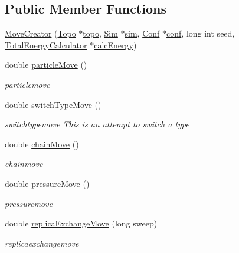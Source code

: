 \subsection*{Public Member Functions}
\begin{DoxyCompactItemize}
\item 
\hyperlink{class_move_creator_aa35bf0832806de7d919a7eed7fb963a5}{Move\+Creator} (\hyperlink{class_topo}{Topo} $\ast$\hyperlink{class_move_creator_a34a03c3300543b9db3f7b03bb77027d3}{topo}, \hyperlink{class_sim}{Sim} $\ast$\hyperlink{class_move_creator_a75cae5ea1a390a8f3dc20e8870576404}{sim}, \hyperlink{class_conf}{Conf} $\ast$\hyperlink{class_move_creator_ab8854d02b8ca0b270709909e2ed1fb27}{conf}, long int seed, \hyperlink{class_total_energy_calculator}{Total\+Energy\+Calculator} $\ast$\hyperlink{class_move_creator_ac60e9b10f19291781e8e3b668044aef9}{calc\+Energy})
\item 
double \hyperlink{class_move_creator_aad8458338233ca1f35638cc9a6823db0}{particle\+Move} ()
\begin{DoxyCompactList}\small\item\em particlemove \end{DoxyCompactList}\item 
double \hyperlink{class_move_creator_a883ac539f14fff01eb0953866a6acc65}{switch\+Type\+Move} ()
\begin{DoxyCompactList}\small\item\em switchtypemove This is an attempt to switch a type \end{DoxyCompactList}\item 
double \hyperlink{class_move_creator_a5daa7c16f81522c9601e340763929a62}{chain\+Move} ()
\begin{DoxyCompactList}\small\item\em chainmove \end{DoxyCompactList}\item 
double \hyperlink{class_move_creator_aad927096be462aa2372becf7fcadde60}{pressure\+Move} ()
\begin{DoxyCompactList}\small\item\em pressuremove \end{DoxyCompactList}\item 
double \hyperlink{class_move_creator_a492daeed703811ac4455ed1a4b6fdd76}{replica\+Exchange\+Move} (long sweep)
\begin{DoxyCompactList}\small\item\em replicaexchangemove \end{DoxyCompactList}\item 

\end{DoxyCompactItemize}
